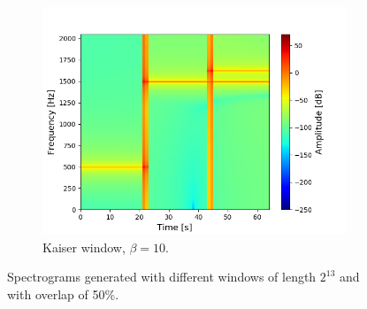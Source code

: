 \begin{figure}[H]
\begin{subfigure}{0.49\textwidth}
\includegraphics[width=\textwidth]{figures/stft_windows/kaiser/10000/10.png}
\caption{Kaiser window, $\beta=10$.}
\label{fig:stft_kaiser_10000_10}
\end{subfigure}

\caption{Spectrograms generated with different windows of length $2^{13}$ and with overlap of 50\%.}
\label{fig:stft_windows_10000}
\end{figure}

